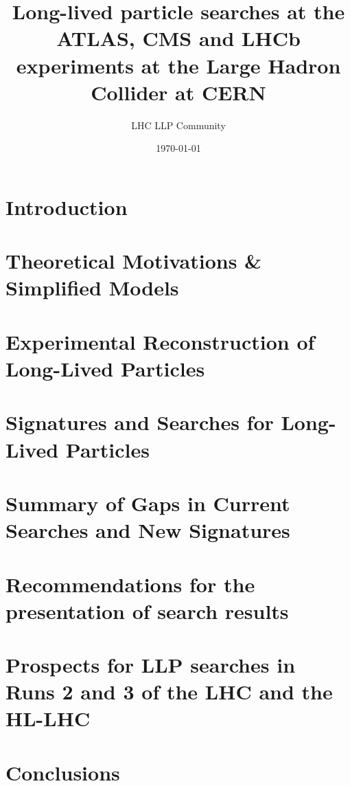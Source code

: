 \documentclass[a4paper,debug,notitlepage,nobib]{tufte-book}
\title{Long-lived particle searches at the ATLAS, CMS and LHCb \\ \smallskip \noindent experiments at the Large Hadron Collider at CERN}
\author{LHC LLP Community}
\date{\today}
\begin{document}
\setcounter{secnumdepth}{3} %



\setcounter{tocdepth}{3}
\tableofcontents
 
\pagebreak

\chapter{Introduction}
\label{sec:Introduction}


\chapter{Theoretical Motivations \& Simplified Models}
\label{sec:theorymotivation}


\chapter{Experimental Reconstruction of Long-Lived Particles}
\label{sec:experimentmotivation}


\chapter{Signatures and Searches for Long-Lived Particles}
\label{sec:signatures}


\chapter{Summary of Gaps in Current Searches and New Signatures}
\label{sec:gaps}


\chapter{Recommendations for the presentation of search results}
\label{sec:recommendations}


\chapter{Prospects for LLP searches in Runs 2 and 3 of the LHC and the HL-LHC}
\label{sec:future} 


\chapter{Conclusions}
\label{sec:conclusions}

 
\end{document}
